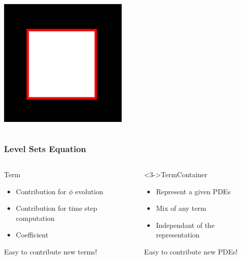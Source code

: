 \begin{frame}
\begin{columns}
{\begin{center}
 \includegraphics[width=0.8\textwidth]{../Art/MalcolmLayers.png}
\end{center}
}

\end{columns}

\end{frame}


\begin{frame}
\frametitle{Level Sets Equation}

\begin{columns}
  \begin{block}{Term}
    \begin{itemize}
      \item Contribution for $\phi$ evolution
      \item Contribution for time step computation
      \item Coefficient
    \end{itemize} 
  \alert<2->{Easy to contribute new terms!}
  \end{block}

  \begin{block}<3->{TermContainer}
    \begin{itemize}
      \item Represent a given PDEs
      \item Mix of any term
      \item Independant of the representation
    \end{itemize}
  \alert<4->{Easy to contribute new PDEs!}
  \end{block}

\end{columns}

\end{frame}

